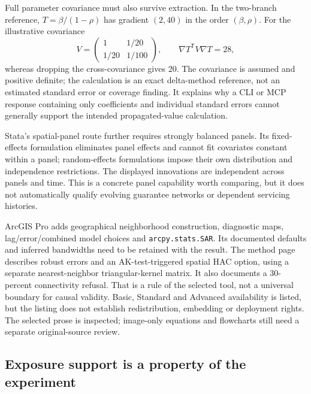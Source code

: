 Full parameter covariance must also survive extraction. In the two-branch
reference, $T=\beta/(1-\rho)$ has gradient $(2,40)$ in the order $(\beta,\rho)$.
For the illustrative covariance
\begin{equation}
 V=\begin{pmatrix}1&1/20\\1/20&1/100\end{pmatrix},\qquad
 \nabla T^{\mathsf T}V\nabla T=28,
 \label{exec20:network-variance}
\end{equation}
whereas dropping the cross-covariance gives 20. The covariance is assumed and
positive definite; the calculation is an exact delta-method reference, not an
estimated standard error or coverage finding. It explains why a CLI or MCP
response containing only coefficients and individual standard errors cannot
generally support the intended propagated-value calculation.
\citep{exec20_network_reference}

Stata's spatial-panel route further requires strongly balanced panels. Its
fixed-effects formulation eliminates panel effects and cannot fit covariates
constant within a panel; random-effects formulations impose their own
distribution and independence restrictions. The displayed innovations are
independent across panels and time. This is a concrete panel capability worth
comparing, but it does not automatically qualify evolving guarantee networks or
dependent servicing histories. \citep{exec20_network_stata_panel}

ArcGIS Pro adds geographical neighborhood construction, diagnostic maps,
lag/error/combined model choices and \texttt{arcpy.stats.SAR}. Its documented
defaults and inferred bandwidths need to be retained with the result. The
method page describes robust errors and an AK-test-triggered spatial HAC option,
using a separate nearest-neighbor triangular-kernel matrix. It also documents a
30-percent connectivity refusal. That is a rule of the selected tool, not a
universal boundary for causal validity. Basic, Standard and Advanced availability
is listed, but the listing does not establish redistribution, embedding or
deployment rights. The selected prose is inspected; image-only equations and
flowcharts still need a separate original-source review.
\citep{exec20_network_arcgis_method,exec20_network_arcgis_tool}

\subsection{Exposure support is a property of the experiment}
\label{exec20:network-exposure}

